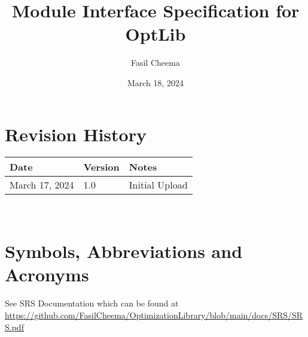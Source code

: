 \documentclass[12pt, titlepage]{article}
\begin{document}
\title{Module Interface Specification for OptLib}

\author{Fasil Cheema}

\date{March 18, 2024}

\maketitle


\section{Revision History}

\begin{tabularx}{\textwidth}{p{3cm}p{2cm}X}
\toprule {\bf Date} & {\bf Version} & {\bf Notes}\\
\midrule
March 17, 2024 & 1.0 & Initial Upload
\bottomrule
\end{tabularx}

~\newpage

\section{Symbols, Abbreviations and Acronyms}

See SRS Documentation which can be found at \url{https://github.com/FasilCheema/OptimizationLibrary/blob/main/docs/SRS/SRS.pdf}
\end{document}
